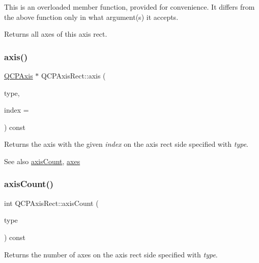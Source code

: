 This is an overloaded member function, provided for convenience. It differs from the above function only in what argument(s) it accepts.

Returns all axes of this axis rect. \mbox{\label{class_q_c_p_axis_rect_a583ae4f6d78b601b732183f6cabecbe1}} 
\subsubsection{\texorpdfstring{axis()}{axis()}}
{\footnotesize\ttfamily \mbox{\hyperlink{class_q_c_p_axis}{Q\+C\+P\+Axis}} $\ast$ Q\+C\+P\+Axis\+Rect\+::axis (\begin{DoxyParamCaption}\item[{\mbox{\hyperlink{class_q_c_p_axis_ae2bcc1728b382f10f064612b368bc18a}{Q\+C\+P\+Axis\+::\+Axis\+Type}}}]{type,  }\item[{int}]{index = {} }\end{DoxyParamCaption}) const}

Returns the axis with the given {\itshape index} on the axis rect side specified with {\itshape type}.

\begin{DoxySeeAlso}{See also}
\mbox{\hyperlink{class_q_c_p_axis_rect_a85b321acec0f694d8b5fdeafdbff3133}{axis\+Count}}, \mbox{\hyperlink{class_q_c_p_axis_rect_a8db4722cb93e9c4a6f0d91150c200867}{axes}} 
\end{DoxySeeAlso}
\mbox{\label{class_q_c_p_axis_rect_a85b321acec0f694d8b5fdeafdbff3133}} 
\subsubsection{\texorpdfstring{axis\+Count()}{axisCount()}}
{\footnotesize\ttfamily int Q\+C\+P\+Axis\+Rect\+::axis\+Count (\begin{DoxyParamCaption}\item[{\mbox{\hyperlink{class_q_c_p_axis_ae2bcc1728b382f10f064612b368bc18a}{Q\+C\+P\+Axis\+::\+Axis\+Type}}}]{type }\end{DoxyParamCaption}) const}

Returns the number of axes on the axis rect side specified with {\itshape type}.

